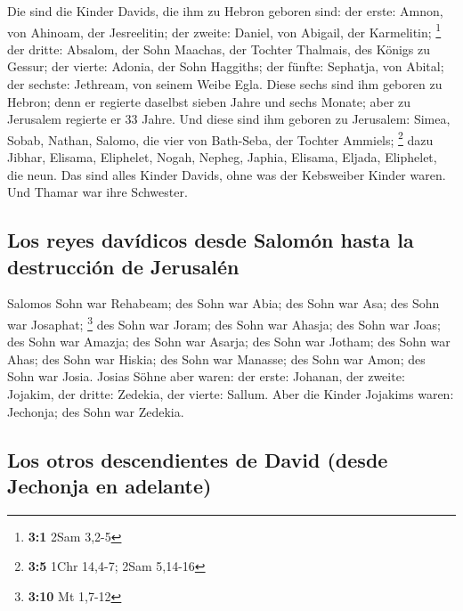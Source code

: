  Die sind die Kinder Davids, die ihm zu Hebron geboren
sind: der erste: Amnon, von Ahinoam, der Jesreelitin; der zweite:
Daniel, von Abigail, der Karmelitin; \footnote{\textbf{3:1} 2Sam 3,2-5}
 der dritte: Absalom, der Sohn Maachas, der Tochter
Thalmais, des Königs zu Gessur; der vierte: Adonia, der Sohn Haggiths;
 der fünfte: Sephatja, von Abital; der sechste: Jethream,
von seinem Weibe Egla.  Diese sechs sind ihm geboren zu
Hebron; denn er regierte daselbst sieben Jahre und sechs Monate; aber zu
Jerusalem regierte er 33 Jahre.  Und diese sind ihm
geboren zu Jerusalem: Simea, Sobab, Nathan, Salomo, die vier von
Bath-Seba, der Tochter Ammiels; \footnote{\textbf{3:5} 1Chr 14,4-7; 2Sam
  5,14-16}  dazu Jibhar, Elisama, Eliphelet,
 Nogah, Nepheg, Japhia,  Elisama, Eljada,
Eliphelet, die neun.  Das sind alles Kinder Davids, ohne
was der Kebsweiber Kinder waren. Und Thamar war ihre Schwester.

\hypertarget{los-reyes-davuxeddicos-desde-salomuxf3n-hasta-la-destrucciuxf3n-de-jerusaluxe9n}{%
\subsection{Los reyes davídicos desde Salomón hasta la destrucción de
Jerusalén}\label{los-reyes-davuxeddicos-desde-salomuxf3n-hasta-la-destrucciuxf3n-de-jerusaluxe9n}}

 Salomos Sohn war Rehabeam; des Sohn war Abia; des Sohn
war Asa; des Sohn war Josaphat; \footnote{\textbf{3:10} Mt 1,7-12}
 des Sohn war Joram; des Sohn war Ahasja; des Sohn war
Joas;  des Sohn war Amazja; des Sohn war Asarja; des Sohn
war Jotham;  des Sohn war Ahas; des Sohn war Hiskia; des
Sohn war Manasse;  des Sohn war Amon; des Sohn war Josia.
 Josias Söhne aber waren: der erste: Johanan, der zweite:
Jojakim, der dritte: Zedekia, der vierte: Sallum.  Aber
die Kinder Jojakims waren: Jechonja; des Sohn war Zedekia.

\hypertarget{los-otros-descendientes-de-david-desde-jechonja-en-adelante}{%
\subsection{Los otros descendientes de David (desde Jechonja en
adelante)}\label{los-otros-descendientes-de-david-desde-jechonja-en-adelante}}

